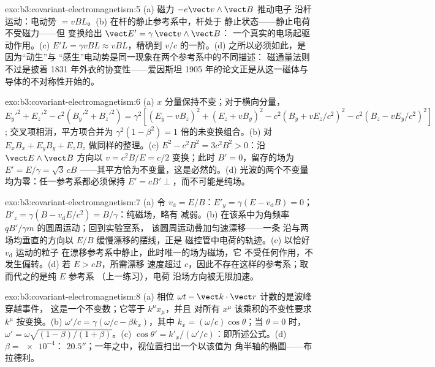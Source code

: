 \begin{solution}{exo:b3:covariant-electromagnetism:5}
(a) 磁力 $-e\vect v\wedge\vect B$ 推动电子
沿杆运动：电动势 $= vBL$。(b) 在杆的静止参考系中，杆处于
静止状态——静止电荷不受磁力——但
变换给出 $\vect E' = \gamma\,\vect v\wedge\vect B$：
一个真实的电场起驱动作用。(c) $E'L = \gamma vBL
\approx vBL$，精确到 $v/c$ 的一阶。(d) 之所以必须如此，是因为“动生”与
“感生”电动势是同一现象在两个参考系中的不同描述：
磁通量法则不过是披着 1831 年外衣的协变性——爱因斯坦
1905 年的论文正是从这一磁体与导体的不对称性开始的。
\end{solution}

\begin{solution}{exo:b3:covariant-electromagnetism:6}
(a) $x$ 分量保持不变；对于横向分量，
$E_y'^2 + E_z'^2 - c^2(B_y'^2 + B_z'^2) = \gamma^2[(E_y - vB_z)^2 +
(E_z + vB_y)^2 - c^2(B_y + vE_z/c^2)^2 - c^2(B_z - vE_y/c^2)^2]$;
交叉项相消，平方项合并为 $\gamma^2(1 -
\beta^2) = 1$ 倍的未变换组合。(b) 对
$E_xB_x + E_yB_y + E_zB_z$ 做同样的整理。(c) $E^2 - c^2B^2 =
3c^2B^2 > 0$：沿 $\vect E\wedge\vect B$ 方向以 $v = c^2B/E =
c/2$ 变换；此时 $B' = 0$，留存的场为 $E' = E/\gamma =
\sqrt3\,cB$ ——其平方恰为不变量，这是必然的。(d) 光波的两个不变量
均为零：任一参考系都必须保持 $E' = cB' \perp$，而不可能是纯场。
\end{solution}

\begin{solution}{exo:b3:covariant-electromagnetism:7}
(a) 令 $v_{\text{d}} = E/B$：$E'_y = \gamma(E - v_{\text{d}}B) =
0$；$B'_z = \gamma(B - v_{\text{d}}E/c^2) = B/\gamma$：纯磁场，略有
减弱。(b) 在该系中为角频率 $qB'/\gamma m$ 的圆周运动；回到实验室系，
该圆周运动叠加匀速漂移——一条
沿与两场均垂直的方向以 $E/B$ 缓慢漂移的摆线，正是
磁控管中电荷的轨迹。(c) 以恰好 $v_{\text{d}}$ 运动的粒子
在漂移参考系中静止，此时唯一的场为磁场，它
不受任何作用，不发生偏转。(d) 若 $E > cB$，所需漂移
速度超过 $c$，因此不存在这样的参考系；取而代之的是纯 $E$ 参考系
（上一练习），电荷
沿场方向被无限加速。
\end{solution}

\begin{solution}{exo:b3:covariant-electromagnetism:8}
(a) 相位 $\omega t - \vect k\cdot\vect r$ 计数的是波峰穿越事件，
这是一个不变数；它等于 $k^\mu x_\mu$，并且
对所有 $x^\mu$ 该乘积的不变性要求 $k^\mu$
按变换。(b) $\omega'/c = \gamma(\omega/c -
\beta k_x)$，其中 $k_x = (\omega/c)\cos\theta$；当 $\theta = 0$ 时，
$\omega' = \omega\sqrt{(1-\beta)/(1+\beta)}$。(c) $\cos\theta' =
k'_x/(\omega'/c)$：即所述公式。(d) $\beta = \num{e-4}$：
$20.5''$；一年之中，视位置扫出一个以该值为
角半轴的椭圆——布拉德利。
\end{solution}

